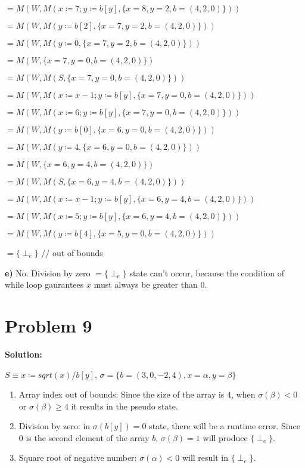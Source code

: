 \documentclass{article}
\begin{document}
\qquad \qquad \qquad \qquad \qquad $=M(W,M(x \coloneqq 7; y \coloneqq b[y],\{x=8, y=2,b=(4,2,0)\}))$

\qquad \qquad \qquad \qquad \qquad $=M(W,M(y \coloneqq b[2],\{x=7, y=2,b=(4,2,0)\}))$

\qquad \qquad \qquad \qquad \qquad $=M(W,M(y \coloneqq 0,\{x=7, y=2,b=(4,2,0)\}))$

\qquad \qquad \qquad \qquad \qquad $=M(W,\{x=7, y=0,b=(4,2,0)\})$

\qquad \qquad \qquad \qquad \qquad $=M(W,M(S,\{x=7, y=0,b=(4,2,0)\}))$

\qquad \qquad \qquad \qquad \qquad $=M(W,M(x \coloneqq x-1; y \coloneqq b[y],\{x=7, y=0,b=(4,2,0)\}))$

\qquad \qquad \qquad \qquad \qquad $=M(W,M(x \coloneqq 6; y \coloneqq b[y],\{x=7, y=0,b=(4,2,0)\}))$

\qquad \qquad \qquad \qquad \qquad $=M(W,M(y \coloneqq b[0],\{x=6, y=0,b=(4,2,0)\}))$

\qquad \qquad \qquad \qquad \qquad $=M(W,M(y \coloneqq 4,\{x=6, y=0,b=(4,2,0)\}))$

\qquad \qquad \qquad \qquad \qquad $=M(W,\{x=6, y=4,b=(4,2,0)\})$

\qquad \qquad \qquad \qquad \qquad $=M(W,M(S,\{x=6, y=4,b=(4,2,0)\}))$

\qquad \qquad \qquad \qquad \qquad $=M(W,M(x \coloneqq x-1; y \coloneqq b[y],\{x=6, y=4,b=(4,2,0)\}))$

\qquad \qquad \qquad \qquad \qquad $=M(W,M(x \coloneqq 5; y \coloneqq b[y],\{x=6, y=4,b=(4,2,0)\}))$

\qquad \qquad \qquad \qquad \qquad $=M(W,M(y \coloneqq b[4],\{x=5, y=0,b=(4,2,0)\}))$

\qquad \qquad \qquad \qquad \qquad $=\{\perp_e\}$ \qquad \qquad \qquad // out of bounds

\vspace{10pt}

\textbf{e)} No. Division by zero $=\{\perp_e\}$ state can't occur, because the condition of while loop gaurantees $x$ must always be greater than $0$.


\section*{Problem 9}
\textbf{Solution:}

$S \equiv x \coloneqq sqrt(x)/b[y]$, $\sigma =\{b=(3,0,-2,4),x=\alpha,y=\beta\}$

\begin{enumerate}
    \item Array index out of bounds: Since the size of the array is $4$, when $ \sigma(\beta)<0 $ or $ \sigma(\beta) \geq 4 $ it results in the pseudo state.
    \item Division by zero: in $\sigma(b[y])=0$ state, there will be a runtime error. Since $0$ is the second element of the array $b$, $\sigma(\beta)=1$ will produce $\{\perp_e\}$.
    \item Square root of negative number: $\sigma(\alpha)<0$ will result in $\{\perp_e\}$.
\end{enumerate}
\end{document}
